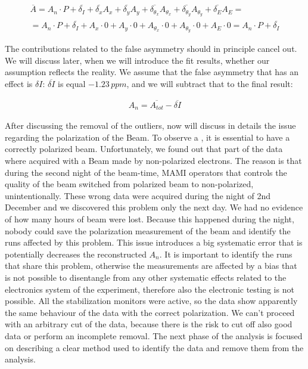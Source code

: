 \begin{align*}
\overline{A} = A_{n} \cdot P + \overline{\delta_{I}} + \overline{\delta_{x}}A_{x} + \overline{\delta_{y}} A_{y} + \overline{\delta_{\theta_{x}}} A_{\theta_{x}} + \overline{\delta_{\theta_{y}}} A_{\theta_{y}} + \overline{\delta_{E}}A_{E} =\\= A_{n} \cdot P + \overline{\delta_{I}} + A_{x}\cdot 0 + A_{y} \cdot 0 +  A_{\theta_{x}} \cdot 0 +  A_{\theta_{y}} \cdot 0 + A_{E} \cdot 0 = A_{n} \cdot P + \overline{\delta_{I}}
\end{align*}  

The contributions related to the false asymmetry should in principle cancel out. We will discuss later, when we will introduce the fit results, whether our assumption reflects the reality. We assume that the false asymmetry that has an effect is $\delta I$: $\overline{\delta I}$ is equal $-1.23 \, ppm$, and we will subtract that to the final result:

\begin{align*}
A_{n} = \overline{A_{tot}} - \overline{\delta I}
\end{align*}

After discussing the removal of the outliers, now will discuss in details the issue regarding the polarization of the Beam. To observe a \transv, it is essential to have a correctly polarized beam.
Unfortunately, we found out that part of the data where acquired with a Beam made by non-polarized electrons. The reason is that during the second night of the beam-time, MAMI operators that controls the quality of the beam switched from polarized beam to non-polarized, unintentionally. These wrong data were acquired during the night of 2nd December and we discovered this problem only the next day. We had no evidence of how many hours of beam were lost. Because this happened during the night, nobody could save the polarization measurement of the beam and identify the runs affected by this problem.
This issue introduces a big systematic error that is potentially decreases the reconstructed $A_{n}$. It is important to identify the runs that share this problem, otherwise the measurements are affected by a bias that is not possible to disentangle from any other systematic effects related to the electronics system of the experiment, therefore also the electronic testing is not possible. 
All the stabilization monitors were active, so the data show apparently the same behaviour of the data with the correct polarization. We can't proceed with an arbitrary cut of the data, because there is the risk to cut off also good data or perform an incomplete removal. The next phase of the analysis is focused on describing a clear method used to identify the data and remove them from the analysis.
 
